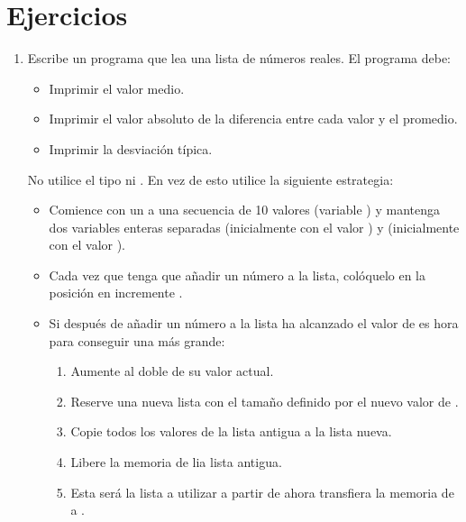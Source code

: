 \section{Ejercicios}

\begin{enumerate}

\item
Escribe un programa que lea una lista de números reales. El programa debe:

\begin{itemize}
  \item Imprimir el valor medio.
  \item Imprimir el valor absoluto de la diferencia entre cada valor y el promedio.
  \item Imprimir la desviación típica.
\end{itemize}

No utilice el tipo  ni . 
En vez de esto utilice la siguiente estrategia:

\begin{itemize}
  \item Comience con un  a una secuencia de 10 valores
        (variable ) y mantenga dos variables enteras separadas 
         (inicialmente con el valor ) y  
        (inicialmente con el valor ).

  \item Cada vez que tenga que añadir un número a la lista, colóquelo en la posición
         en incremente .

  \item Si después de añadir un número a la lista  ha alcanzado el valor
        de  es hora para conseguir una  más grande:
    \begin{enumerate}
      \item Aumente  al doble de su valor actual.
      \item Reserve una nueva lista  con el tamaño definido por el 
            nuevo valor de .
      \item Copie todos los valores de la lista antigua a la lista nueva.
      \item Libere la memoria de lia lista antigua.
      \item Esta será la lista a utilizar a partir de ahora transfiera la memoria de
             a .
    \end{enumerate}
\end{itemize}

\end{enumerate}


